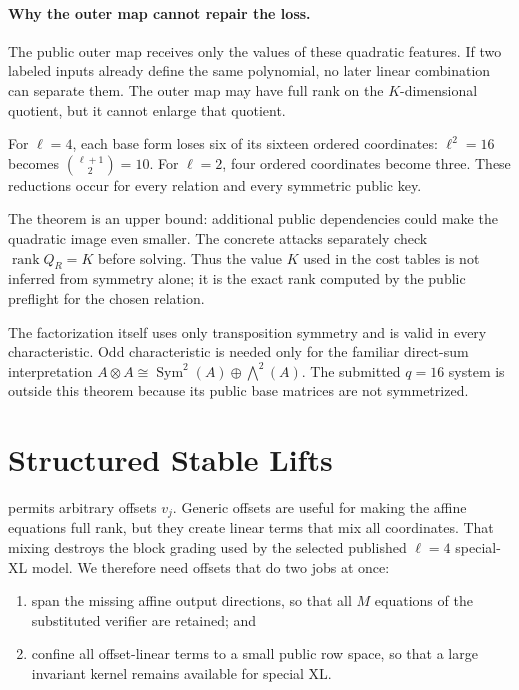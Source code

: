 \documentclass[11pt]{article}
\newcommand{\Sym}{\operatorname{Sym}}
\newcommand{\rank}{\operatorname{rank}}
\begin{document}
\paragraph{Why the outer map cannot repair the loss.}
The public outer map receives only the values of these quadratic features.  If
two labeled inputs already define the same polynomial, no later linear
combination can separate them.  The outer map may have full rank on the
$K$-dimensional quotient, but it cannot enlarge that quotient.

For $\ell=4$, each base form loses six of its sixteen ordered coordinates:
$\ell^2=16$ becomes $\binom{\ell+1}{2}=10$.  For $\ell=2$, four ordered
coordinates become three.  These reductions occur for every relation and every
symmetric public key.

The theorem is an upper bound: additional public dependencies could make the
quadratic image even smaller.  The concrete attacks separately check
$\rank Q_R=K$ before solving.  Thus the value $K$ used in the cost tables is
not inferred from symmetry alone; it is the exact rank computed by the public
preflight for the chosen relation.

The factorization itself uses only transposition symmetry and is valid in every
characteristic.  Odd characteristic is needed only for the familiar direct-sum
interpretation
$A\otimes A\cong\Sym^2(A)\oplus\bigwedge^2(A)$.  The submitted $q=16$ system is
outside this theorem because its public base matrices are not symmetrized.

\section{Structured Stable Lifts}\label{sec:structured-lift}

 permits arbitrary offsets $v_j$.  Generic offsets
are useful for making the affine equations full rank, but they create linear
terms that mix all coordinates.  That mixing destroys the block grading used
by the selected published $\ell=4$ special-XL model.  We therefore need offsets
that do two jobs at once:
\begin{enumerate}[label=(\roman*),itemsep=2pt]
\item span the missing affine output directions, so that all $M$ equations of
      the substituted verifier are retained; and
\item confine all offset-linear terms to a small public row space, so that a
      large invariant kernel remains available for special XL.\@
\end{enumerate}
\end{document}
